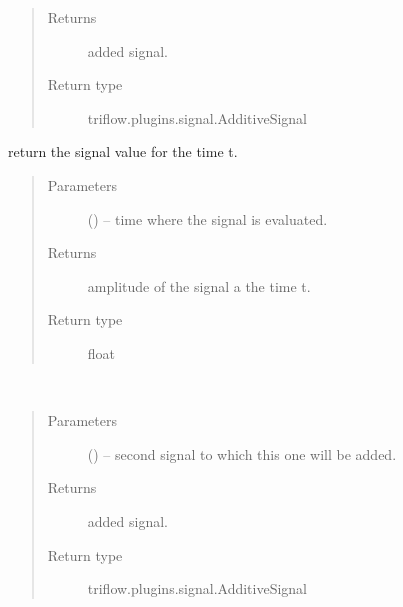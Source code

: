 \documentclass[letterpaper,10pt,english]{sphinxmanual}
\begin{document}
\begin{fulllineitems}
\begin{fulllineitems}
\begin{quote}
\begin{description}
\item[{Returns}] \leavevmode
added signal.

\item[{Return type}] \leavevmode
triflow.plugins.signal.AdditiveSignal

\end{description}\end{quote}

\end{fulllineitems}


\begin{fulllineitems}
\label{\detokenize{triflow.plugins:triflow.plugins.signals.Signal.__call__}}
return the signal value for the time t.
\begin{quote}\begin{description}
\item[{Parameters}] \leavevmode
{} () -- time where the signal is evaluated.

\item[{Returns}] \leavevmode
amplitude of the signal a the time t.

\item[{Return type}] \leavevmode
float

\end{description}\end{quote}

\end{fulllineitems}


\begin{fulllineitems}
\label{\detokenize{triflow.plugins:triflow.plugins.signals.Signal.__sub__}}~\begin{quote}\begin{description}
\item[{Parameters}] \leavevmode
{} () -- second signal to which this one will be added.

\item[{Returns}] \leavevmode
added signal.

\item[{Return type}] \leavevmode
triflow.plugins.signal.AdditiveSignal


\end{description}
\end{quote}
\end{fulllineitems}
\end{fulllineitems}
\end{document}
